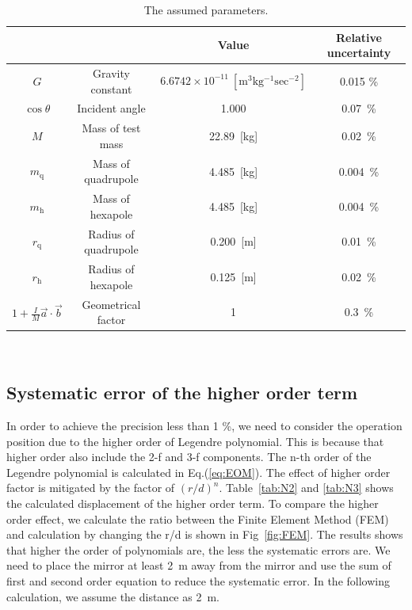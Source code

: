 \documentclass[A4]{spie}  %
\begin{document}
\begin{table}
\begin{center}
\caption{\label{sus}The assumed parameters.}
\footnotesize
\begin{tabular}{cccc}
\hline
&&Value&Relative uncertainty \\
\hline
$G$& Gravity constant&$6.6742 \times 10^{-11}~\mathrm{[m^3kg^{-1}sec^{-2}]}$&0.015 \%\\
$\cos{\theta}$& Incident angle&1.000& 0.07~\%\\
$M$& Mass of test mass&22.89~[kg] & 0.02~\%\\
$m_{\mathrm{q}}$&Mass of quadrupole&4.485~[kg] & 0.004~\%\\
$m_{\mathrm{h}}$&Mass of hexapole& 4.485~[kg] &0.004~\%\\
$r_{\mathrm{q}}$&Radius of quadrupole&0.200~[m] & 0.01~\%\\
$r_{\mathrm{h}}$&Radius of hexapole& 0.125~[m] & 0.02~\%\\
$1+\frac{I}{M}\vec{a}\cdot \vec{b}$& Geometrical factor & 1&0.3~\% \\
\hline
\end{tabular}\\
\end{center}
\end{table}

\subsection{Systematic error of the higher order term}
In order to achieve the precision less than 1 \%, we need to consider the operation position due to the higher order of Legendre polynomial. This is because that higher order also include the 2-f and 3-f components. The n-th order of the Legendre polynomial is calculated in Eq.(\ref{eq:EOM}). The effect of higher order factor is mitigated by the factor of $(r/d)^n$. Table~\ref{tab:N2} and \ref{tab:N3} shows the calculated displacement of the higher order term. To compare the higher order effect, we calculate the ratio between the Finite Element Method (FEM) and calculation by changing the r/d is shown in Fig~\ref{fig:FEM}. The results shows that higher the order of polynomials are, the less the systematic errors are. We need to place the mirror at least 2~m away from the mirror and use the sum of first and second order equation to reduce the systematic error. In the following calculation, we assume the distance as 2~m. 
\end{document}

